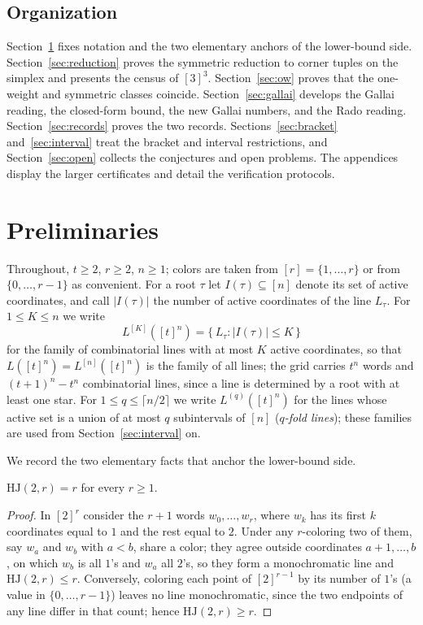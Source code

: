 \documentclass[12pt]{article}
\newcommand{\HJ}{\mathrm{HJ}}
\newcommand{\Ls}{L}
\begin{document}
\subsection*{Organization}
Section~\ref{sec:prelim} fixes notation and the two elementary anchors
of the lower-bound side. Section~\ref{sec:reduction} proves the
symmetric reduction to corner tuples on the simplex and presents the
census of $[3]^{3}$. Section~\ref{sec:ow} proves that the one-weight
and symmetric classes coincide. Section~\ref{sec:gallai} develops the
Gallai reading, the closed-form bound, the new Gallai numbers, and the
Rado reading. Section~\ref{sec:records} proves the two records.
Sections~\ref{sec:bracket} and~\ref{sec:interval} treat the bracket
and interval restrictions, and Section~\ref{sec:open} collects the
conjectures and open problems. The appendices display the larger
certificates and detail the verification protocols.

\section{Preliminaries}\label{sec:prelim}

Throughout, $t\ge 2$, $r\ge 2$, $n\ge 1$; colors are taken from
$[r]=\{1,\dots,r\}$ or from $\{0,\dots,r-1\}$ as convenient. For a root
$\tau$ let $I(\tau)\subseteq[n]$ denote its set of active coordinates,
and call $|I(\tau)|$ the number of active coordinates of the line
$\Ls_{\tau}$. For $1\le K\le n$ we write
\[
\Ls^{[K]}([t]^{n})=\{\,\Ls_{\tau} : |I(\tau)|\le K\,\}
\]
for the family of combinatorial lines with at most $K$ active
coordinates, so that $\Ls([t]^{n})=\Ls^{[n]}([t]^{n})$ is the family of
all lines; the grid carries $t^{n}$ words and $(t+1)^{n}-t^{n}$
combinatorial lines, since a line is determined by a root with at least
one star. For $1\le q\le\lceil n/2\rceil$ we write
$\Ls^{(q)}([t]^{n})$ for the lines whose active set is a union of at
most $q$ subintervals of $[n]$ (\emph{$q$-fold lines}); these families
are used from Section~\ref{sec:interval} on.

We record the two elementary facts that anchor the lower-bound side.

\begin{proposition}\label{prop:hj2r}
$\HJ(2,r)=r$ for every $r\ge 1$.
\end{proposition}

\begin{proof}
In $[2]^{r}$ consider the $r+1$ words $w_{0},\dots,w_{r}$, where $w_{k}$
has its first $k$ coordinates equal to $1$ and the rest equal to $2$.
Under any $r$-coloring two of them, say $w_{a}$ and $w_{b}$ with $a<b$,
share a color; they agree outside coordinates $a+1,\dots,b$, on which
$w_{b}$ is all $1$'s and $w_{a}$ all $2$'s, so they form a monochromatic
line and $\HJ(2,r)\le r$. Conversely, coloring each point of
$[2]^{r-1}$ by its number of $1$'s (a value in $\{0,\dots,r-1\}$)
leaves no line monochromatic, since the two endpoints of any line differ
in that count; hence $\HJ(2,r)\ge r$.
\end{proof}
\end{document}
